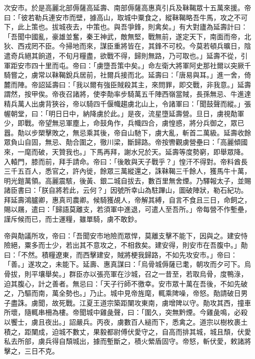 \begin{pinyinscope}
 次安市。於是高麗北部傉薩高延壽、南部傉薩高惠真引兵及靺鞨眾十五萬來援。帝曰：「彼若勒兵連安市而壁，據高山，取城中粟食之，縱靺鞨略吾牛馬，攻之不可下，此上策也。拔城夜去，中策也。與吾爭鋒，則禽矣。」有大對廬為延壽計曰：「吾聞中國亂，豪雄並奮，秦王神武，敵無堅，戰無前，遂定天下，南面而帝，北狄、西戎罔不臣。今掃地而來，謀臣重將皆在，其鋒不可校。今莫若頓兵曠日，陰遣奇兵絕其餉道，不旬月糧盡，欲戰不得，歸則無路，乃可取也。」延壽不從，引軍距安市四十里而屯。帝曰：「虜墮吾策中矣。」命左衛大將軍阿史那社爾以突厥千騎嘗之，虜常以靺鞨銳兵居前，社爾兵接而北。延壽曰：「唐易與耳。」進一舍，倚麓而陣。帝詔延壽曰：「我以爾有強臣賊殺其主，來問罪，即交戰，非我意。」延壽謂然，按甲俟。帝夜召諸將，使李勣率步騎萬五千陣西嶺當賊，長孫無忌、牛進達精兵萬人出虜背狹谷，帝以騎四千偃幟趨虜北山上，令諸軍曰：「聞鼓聲而縱。」張幄朝堂，曰：「明日日中，納降虜於此。」是夜，流星墮延壽營。旦日，虜視勣軍少，即戰。帝望無忌軍塵上，命鼓角作，兵幟四合，虜惶惑，將分兵御之，眾已囂。勣以步槊擊敗之，無忌乘其後，帝自山馳下，虜大亂，斬首二萬級。延壽收餘眾負山自固，無忌、勣合圍之，徹川梁，斷歸路。帝按轡觀虜營壘曰：「高麗傾國來，一麾而破，天贊我也。」下馬再拜，謝水兄於天。延壽等度勢窮，即舉眾降。入轅門，膝而前，拜手請命。帝曰：「後敢與天子戰乎？」惶汗不得對。帝料酋長三千五百人，悉官之，許內徙，餘眾三萬縱還之，誅靺鞨三千餘人，獲馬牛十萬，明光鎧萬領。高麗震駭，後黃、銀二城自拔去，數百里無舍煙。乃驛報太子，並賜諸臣書曰：「朕自將若此，云何？」因號所幸山為駐蹕山，圖破陣狀，勒石紀功。拜延壽鴻臚卿，惠真司農卿。候騎獲覘人，帝解其縛，自言不食且三日，命飼之，賜以屩，遣曰：「歸語莫離支，若須軍中進退，可遣人至吾所。」帝每營不作塹壘，謹斥候而已，而士運糧，雖單騎，虜不敢鈔。



 帝與勣議所攻，帝曰：「吾聞安市地險而眾悍，莫離支擊不能下，因與之。建安恃險絕，粟多而士少，若出其不意攻之，不相救矣。建安得，則安市在吾腹中。」勣曰：「不然。積糧遼東，而西擊建安，賊將梗我歸路，不如先攻安市。」帝曰：「善。」遂攻之，未能下。延壽、惠真謀曰：「烏骨城傉薩已耄，朝攻而夕可下。烏骨拔，則平壤舉矣。」群臣亦以張亮軍在沙城，召之一昔至，若取烏骨，度鴨淥，迫其腹心，計之善者。無忌曰：「天子行師不徼幸。安市眾十萬在吾後，不如先破之，乃驅而南，萬全勢也。」乃止。城中見帝旌麾，輒乘陴噪，帝怒。勣請破日男子盡誅。虜聞，故死戰。江夏王道宗築距闉攻東南，虜增陴以守。勣攻其西，撞車所壞，隨輒串柵為樓。帝聞城中雞彘聲，曰：「圍久，突無黔煙。今雞彘鳴，必殺以饗士，虜且夜出。」詔嚴兵。丙夜，虜數百人縋而下，悉禽之。道宗以樹枚裹土積之，距闉成，迫城不數丈，果毅都尉傅伏愛守之，自高而排其城，城且頹，伏愛私去所部，虜兵得自頹城出，據而塹斷之，積火縈盾固守。帝怒，斬伏愛，敕諸將擊之，三日不克。




\end{pinyinscope}
